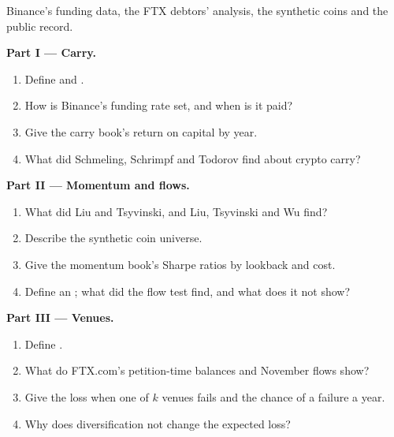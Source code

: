 \begin{problem}\label{pb:s1:crypto-medium-frequency-strategies:1}
Binance's funding data, the FTX debtors' analysis, the synthetic coins and the public record.

\medskip\noindent\textbf{Part I --- Carry.}
\begin{enumerate}
\item Define  and .
\item How is Binance's funding rate set, and when is it paid?
\item Give the carry book's return on capital by year.
\item What did Schmeling, Schrimpf and Todorov find about crypto carry?
\end{enumerate}

\medskip\noindent\textbf{Part II --- Momentum and flows.}
\begin{enumerate}[resume]
\item What did Liu and Tsyvinski, and Liu, Tsyvinski and Wu find?
\item Describe the synthetic coin universe.
\item Give the momentum book's Sharpe ratios by lookback and cost.
\item Define an ; what did the flow test find, and what does it not show?
\end{enumerate}

\medskip\noindent\textbf{Part III --- Venues.}
\begin{enumerate}[resume]
\item Define .
\item What do FTX.com's petition-time balances and November flows show?
\item Give the loss when one of $k$ venues fails and the chance of a failure a year.
\item Why does diversification not change the expected loss?
\end{enumerate}


\end{problem}
